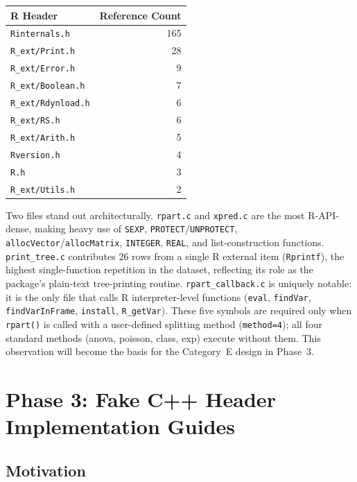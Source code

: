 \documentclass[12pt]{article}
\begin{document}
\medskip
\begin{center}
\begin{tabular}{lr}
\toprule
R Header & Reference Count \\
\midrule
\texttt{Rinternals.h} & 165 \\
\texttt{R\_ext/Print.h} & 28 \\
\texttt{R\_ext/Error.h} & 9 \\
\texttt{R\_ext/Boolean.h} & 7 \\
\texttt{R\_ext/Rdynload.h} & 6 \\
\texttt{R\_ext/RS.h} & 6 \\
\texttt{R\_ext/Arith.h} & 5 \\
\texttt{Rversion.h} & 4 \\
\texttt{R.h} & 3 \\
\texttt{R\_ext/Utils.h} & 2 \\
\bottomrule
\end{tabular}
\end{center}
\medskip

Two files stand out architecturally. \texttt{rpart.c} and \texttt{xpred.c} are the most R-API-dense, making heavy use of \texttt{SEXP}, \texttt{PROTECT}/\texttt{UNPROTECT}, \texttt{allocVector}/\texttt{allocMatrix}, \texttt{INTEGER}, \texttt{REAL}, and list-construction functions. \texttt{print\_tree.c} contributes 26 rows from a single R external item (\texttt{Rprintf}), the highest single-function repetition in the dataset, reflecting its role as the package's plain-text tree-printing routine. \texttt{rpart\_callback.c} is uniquely notable: it is the only file that calls R interpreter-level functions (\texttt{eval}, \texttt{findVar}, \texttt{findVarInFrame}, \texttt{install}, \texttt{R\_getVar}). These five symbols are required only when \texttt{rpart()} is called with a user-defined splitting method (\texttt{method=4}); all four standard methods (anova, poisson, class, exp) execute without them. This observation will become the basis for the Category~E design in Phase~3.

\section{Phase 3: Fake C++ Header Implementation Guides}
\label{sec:phase3}

\subsection{Motivation}
\end{document}
